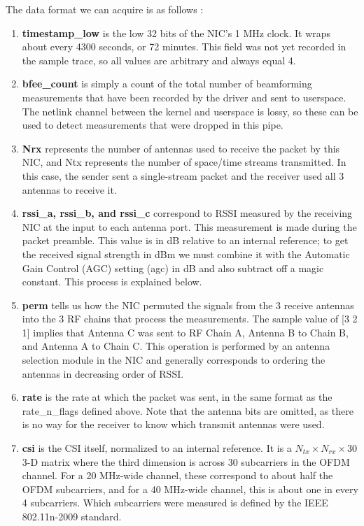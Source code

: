 \documentclass[conference]{IEEEtran}
\begin{document}
The data format we can acquire is as follows \cite{halperin2011tool}:
\begin{enumerate}
\item \textbf{timestamp\_low} is the low 32 bits of the NIC's 1 MHz clock. It wraps about every 4300 seconds, or 72 minutes. This field was not yet recorded in the sample trace, so all values are arbitrary and always equal 4.

\item \textbf{bfee\_count} is simply a count of the total number of beamforming measurements that have been recorded by the driver and sent to userspace. The netlink channel between the kernel and userspace is lossy, so these can be used to detect measurements that were dropped in this pipe.

\item \textbf{Nrx} represents the number of antennas used to receive the packet by this NIC, and Ntx represents the number of space/time streams transmitted. In this case, the sender sent a single-stream packet and the receiver used all 3 antennas to receive it.

\item \textbf{rssi\_a, rssi\_b, and rssi\_c} correspond to RSSI measured by the receiving NIC at the input to each antenna port. This measurement is made during the packet preamble. This value is in dB relative to an internal reference; to get the received signal strength in dBm we must combine it with the Automatic Gain Control (AGC) setting (agc) in dB and also subtract off a magic constant. This process is explained below.

\item \textbf{perm} tells us how the NIC permuted the signals from the 3 receive antennas into the 3 RF chains that process the measurements. The sample value of [3 2 1] implies that Antenna C was sent to RF Chain A, Antenna B to Chain B, and Antenna A to Chain C. This operation is performed by an antenna selection module in the NIC and generally corresponds to ordering the antennas in decreasing order of RSSI.

\item \textbf{rate} is the rate at which the packet was sent, in the same format as the rate\_n\_flags defined above. Note that the antenna bits are omitted, as there is no way for the receiver to know which transmit antennas were used.

\item \textbf{csi} is the CSI itself, normalized to an internal reference. It is a $N_{tx} \times N_{rx} \times 30$ 3-D matrix where the third dimension is across 30 subcarriers in the OFDM channel. For a 20 MHz-wide channel, these correspond to about half the OFDM subcarriers, and for a 40 MHz-wide channel, this is about one in every 4 subcarriers. Which subcarriers were measured is defined by the IEEE 802.11n-2009 standard.
\end{enumerate}
\end{document}
